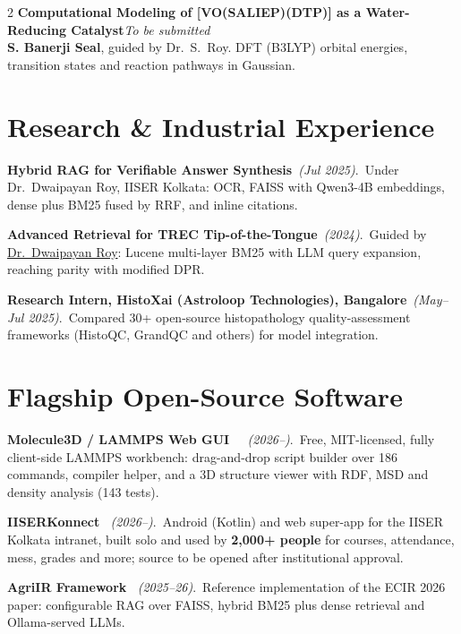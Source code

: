 \documentclass[a4paper,10.5pt]{extarticle}
\newcommand{\entry}[3]{%
  {\normalsize\textbf{#1}}\hfill{\small\itshape\textcolor{mutedtext}{#2}}\\[0.04em]
  {\small #3}\par\vspace{3pt}%
}
\newcommand{\proj}[3]{{\small\textbf{#1}~{\itshape\textcolor{mutedtext}{(#2)}}.\ #3}\par\vspace{2.8pt}}
\begin{document}
\begin{paracol}{2}
\entry{Computational Modeling of [VO(SALIEP)(DTP)] as a Water-Reducing Catalyst}{To be submitted}{%
\textbf{S. Banerji Seal}, guided by Dr.~S.~Roy. DFT (B3LYP) orbital energies, transition states and reaction pathways in Gaussian.}

\section{Research \& Industrial Experience}

\proj{Hybrid RAG for Verifiable Answer Synthesis}{Jul 2025}{Under Dr.~Dwaipayan Roy, IISER Kolkata: OCR, FAISS with Qwen3-4B embeddings, dense plus BM25 fused by RRF, and inline citations.}

\proj{Advanced Retrieval for TREC Tip-of-the-Tongue}{2024}{Guided by \href{https://dwaipayanroy.github.io/}{Dr.~Dwaipayan Roy}: Lucene multi-layer BM25 with LLM query expansion, reaching parity with modified DPR.}

\proj{Research Intern, HistoXai (Astroloop Technologies), Bangalore}{May--Jul 2025}{Compared 30+ open-source histopathology quality-assessment frameworks (HistoQC, GrandQC and others) for model integration.}

\switchcolumn

\section{Flagship Open-Source Software}

\proj{Molecule3D / LAMMPS Web GUI \href{https://github.com/Shuvam-Banerji-Seal/lammps-web-gui}{\faGithub}~\href{https://shuvam-banerji-seal.github.io/lammps-web-gui/}{\faGlobe}}{2026--}{Free, MIT-licensed, fully client-side LAMMPS workbench: drag-and-drop script builder over 186 commands, compiler helper, and a 3D structure viewer with RDF, MSD and density analysis (143 tests).}

\proj{IISERKonnect \href{https://shuvam-banerji-seal.github.io/iiserkonnect-website/}{\faGlobe}}{2026--}{Android (Kotlin) and web super-app for the IISER Kolkata intranet, built solo and used by \textbf{2,000+ people} for courses, attendance, mess, grades and more; source to be opened after institutional approval.}

\proj{AgriIR Framework \href{https://github.com/Shuvam-Banerji-Seal/AgriIR}{\faGithub}}{2025--26}{Reference implementation of the ECIR 2026 paper: configurable RAG over FAISS, hybrid BM25 plus dense retrieval and Ollama-served LLMs.}


\end{paracol}
\end{document}
